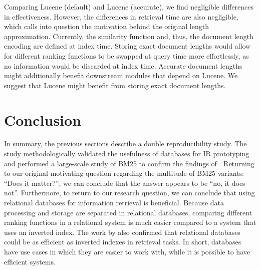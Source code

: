 Comparing Lucene (default) and Lucene (accurate), we find negligible differences in effectiveness. However, the differences in retrieval time are also negligible, which calls into question the motivation behind the original length approximation. Currently, the similarity function and, thus, the document length encoding are defined at index time. Storing exact document lengths would allow for different ranking functions to be swapped at query time more effortlessly, as no information would be discarded at index time. Accurate document lengths might additionally benefit downstream modules that depend on Lucene. We suggest that Lucene might benefit from storing exact document lengths.

\section{Conclusion}
In summary, the previous sections describe a double reproducibility study. The study methodologically validated the usefulness of databases for IR prototyping and performed a large-scale study of BM25 to confirm the findings of \citet{trotman-bm25}. Returning to our original motivating question regarding the multitude of BM25 variants: ``Does it matter?'', we can conclude that the answer appears to be ``no, it does not''.
Furthermore, to return to our research question, we can conclude that using relational databases for information retrieval is beneficial. Because data processing and storage are separated in relational databases, comparing different ranking functions in a relational system is much easier compared to a system that uses an inverted index. The work by \cite{OldDog} also confirmed that relational databases could be as efficient as inverted indexes in retrieval tasks. In short, databases have use cases in which they are easier to work with, while it is possible to have efficient systems.

